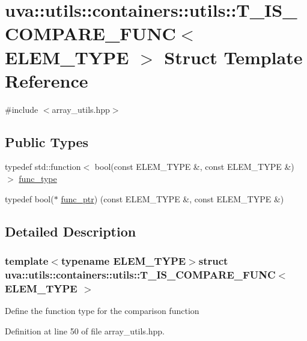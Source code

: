 \hypertarget{structuva_1_1utils_1_1containers_1_1utils_1_1_t___i_s___c_o_m_p_a_r_e___f_u_n_c}{}\section{uva\+:\+:utils\+:\+:containers\+:\+:utils\+:\+:T\+\_\+\+I\+S\+\_\+\+C\+O\+M\+P\+A\+R\+E\+\_\+\+F\+U\+N\+C$<$ E\+L\+E\+M\+\_\+\+T\+Y\+P\+E $>$ Struct Template Reference}
\label{structuva_1_1utils_1_1containers_1_1utils_1_1_t___i_s___c_o_m_p_a_r_e___f_u_n_c}


{\ttfamily \#include $<$array\+\_\+utils.\+hpp$>$}

\subsection*{Public Types}
\begin{DoxyCompactItemize}
\item 
typedef std\+::function$<$ bool(const E\+L\+E\+M\+\_\+\+T\+Y\+P\+E \&, const E\+L\+E\+M\+\_\+\+T\+Y\+P\+E \&) $>$ \hyperlink{structuva_1_1utils_1_1containers_1_1utils_1_1_t___i_s___c_o_m_p_a_r_e___f_u_n_c_a526315e110dfa5adeb3547cb4c74bfef}{func\+\_\+type}
\item 
typedef bool($\ast$ \hyperlink{structuva_1_1utils_1_1containers_1_1utils_1_1_t___i_s___c_o_m_p_a_r_e___f_u_n_c_a61f5648bfc3504c58120f0fc85d50ff1}{func\+\_\+ptr}) (const E\+L\+E\+M\+\_\+\+T\+Y\+P\+E \&, const E\+L\+E\+M\+\_\+\+T\+Y\+P\+E \&)
\end{DoxyCompactItemize}


\subsection{Detailed Description}
\subsubsection*{template$<$typename E\+L\+E\+M\+\_\+\+T\+Y\+P\+E$>$struct uva\+::utils\+::containers\+::utils\+::\+T\+\_\+\+I\+S\+\_\+\+C\+O\+M\+P\+A\+R\+E\+\_\+\+F\+U\+N\+C$<$ E\+L\+E\+M\+\_\+\+T\+Y\+P\+E $>$}

Define the function type for the comparison function 

Definition at line 50 of file array\+\_\+utils.\+hpp.



